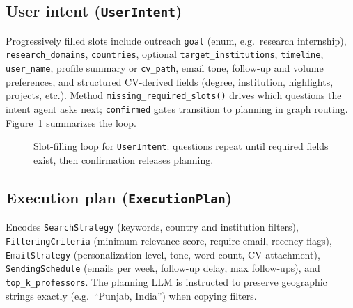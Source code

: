 \documentclass[11pt,a4paper]{article}
\begin{document}
\subsection{User intent (\texttt{UserIntent})}
Progressively filled slots include outreach \texttt{goal} (enum, e.g.\ research internship), \texttt{research\_domains}, \texttt{countries}, optional \texttt{target\_institutions}, \texttt{timeline}, \texttt{user\_name}, profile summary or \texttt{cv\_path}, email tone, follow-up and volume preferences, and structured CV-derived fields (degree, institution, highlights, projects, etc.). Method \texttt{missing\_required\_slots()} drives which questions the intent agent asks next; \texttt{confirmed} gates transition to planning in graph routing. Figure~\ref{fig:intent-slots} summarizes the loop.

\begin{figure}[htbp]
\centering
{}
\caption{Slot-filling loop for \texttt{UserIntent}: questions repeat until required fields exist, then confirmation releases planning.}
\label{fig:intent-slots}
\end{figure}

\subsection{Execution plan (\texttt{ExecutionPlan})}
Encodes \texttt{SearchStrategy} (keywords, country and institution filters), \texttt{FilteringCriteria} (minimum relevance score, require email, recency flags), \texttt{EmailStrategy} (personalization level, tone, word count, CV attachment), \texttt{SendingSchedule} (emails per week, follow-up delay, max follow-ups), and \texttt{top\_k\_professors}. The planning LLM is instructed to preserve geographic strings exactly (e.g.\ ``Punjab, India'') when copying filters.
\end{document}
